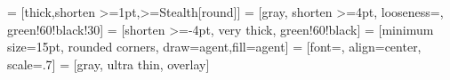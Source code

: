 \usepackage{xcolor}

\usetikzlibrary{arrows.meta}


 = [thick,shorten >=1pt,>={Stealth[round]}]
 = [gray, shorten >=4pt, looseness=\loose, green!60!black!30]
 = [shorten >=-4pt, very thick, green!60!black]
 = [minimum size=15pt, rounded corners, draw=agent,fill=agent]
 = [font=\scriptsize, align=center, scale=.7]
 = [gray, ultra thin, overlay]
\def\loose{.7}